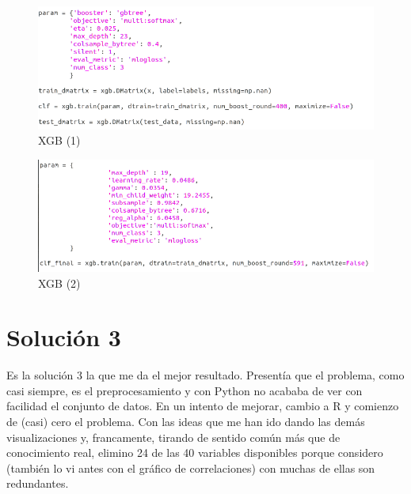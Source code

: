 \begin{figure}[H] %
	\centering
	\includegraphics[scale=0.5]{xgb2.png}  %
	\caption{XGB (1)} 
	\label{fig:xgb2}
\end{figure}

\begin{figure}[H] %
	\centering
	\includegraphics[scale=0.5]{xgb3.png}  %
	\caption{XGB (2)} 
	\label{fig:xgb3}
\end{figure}

\newpage

\section{Solución 3}

Es la solución 3 la que me da el mejor resultado. Presentía que el problema, como casi siempre, es el preprocesamiento y con Python no acababa de ver con facilidad el conjunto de datos. En un intento de mejorar, cambio a R y comienzo de (casi) cero el problema. Con las ideas que me han ido dando las demás visualizaciones y, francamente, tirando de sentido común más que de conocimiento real, elimino 24 de las 40 variables disponibles porque considero (también lo vi antes con el gráfico de correlaciones) con muchas de ellas son redundantes. 

